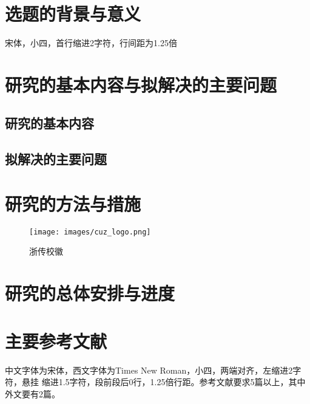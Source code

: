 \section{选题的背景与意义}

\begin{tcolorbox}
	宋体，小四，首行缩进2字符，行间距为1.25倍
\end{tcolorbox}

\lipsum[1]\cite{Bohan1928,chen1980zhongguo}

\section{研究的基本内容与拟解决的主要问题}

\subsection{研究的基本内容}

\lipsum[2-3]\cite{chen2005zhulu,chu2004tushu,yuan2012lanc}

\subsection{拟解决的主要问题}

\lipsum[4]

\section{研究的方法与措施}

\lipsum[5-7]\cite{lamport1986document,niu2013zonghe}

\begin{figure}[h]
	\centering
	\texttt{[image: images/cuz\_logo.png]}
	\caption{浙传校徽}
	\label{fig:1}
\end{figure}

\section{研究的总体安排与进度}

\lipsum[8-11]\cite{wikibook2014latex,Dubrovin1906,hls2012jinji}

\section{主要参考文献}

\begin{tcolorbox}
	中文字体为宋体，西文字体为Times New Roman，小四，两端对齐，左缩进2字符，悬挂
	缩进1.5字符，段前段后0行，1.25倍行距。参考文献要求5篇以上，其中外文要有2篇。
\end{tcolorbox}

